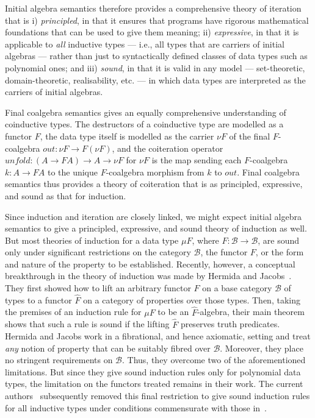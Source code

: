 \documentclass{LMCS}
\newcommand{\ra}{\rightarrow}
\newcommand\B{{\mathcal B}}
\theoremstyle{plain}
\theoremstyle{remark}
\theoremstyle{definition}
\begin{document}
Initial algebra semantics therefore provides a comprehensive theory of
iteration that is i) {\em principled}, in that it ensures that
programs have rigorous mathematical foundations that can be used to
give them meaning; ii) {\em expressive}, in that it is applicable to
{\em all} inductive types --- i.e., all types that are carriers of
initial algebras --- rather than just to syntactically defined classes
of data types such as polynomial ones; and iii) {\em sound}, in that
it is valid in any model --- set-theoretic, domain-theoretic,
realisability, etc. --- in which data types are interpreted as the
carriers of initial algebras.

Final coalgebra semantics gives an equally comprehensive understanding
of coinductive types. The destructors of a coinductive type are
modelled as a functor $F$, the data type itself is modelled as the
carrier $\nu F$ of the final $F$-coalgebra $\mathit{out} : \nu F \ra
F(\nu F)$, and the coiteration operator $\mathit{unfold} : (A \ra F A)
\ra A \ra \nu F$ for $\nu F$ is the map sending each $F$-coalgebra
$k:A \ra FA$ to the unique $F$-coalgebra morphism from $k$ to
$\mathit{out}$.  Final coalgebra semantics thus provides a theory of
coiteration that is as principled, expressive, and sound as that for
induction.

Since induction and iteration are closely linked, we might expect
initial algebra semantics to give a principled, expressive, and sound
theory of induction as well. But most theories of induction for a data
type $\mu F$, where $F:\B \ra \B$, are sound only under significant
restrictions on the category $\B$, the functor $F$, or the form and
nature of the property to be established. Recently, however, a
conceptual breakthrough in the theory of induction was made by Hermida
and Jacobs~\cite{hj98}. They first showed how to lift an arbitrary
functor $F$ on a base category $\B$ of types to a functor $\hat{F}$ on
a category of properties over those types. Then, taking the premises
of an induction rule for $\mu F$ to be an $\hat{F}$-algebra, their
main theorem shows that such a rule is sound if the lifting $\hat{F}$
preserves truth predicates. Hermida and Jacobs work in a fibrational,
and hence axiomatic, setting and treat {\em any} notion of property
that can be suitably fibred over $\B$. Moreover, they place no
stringent requirements on $\B$. Thus, they overcome two of the
aforementioned limitations. But since they give sound induction rules
only for polynomial data types, the limitation on the functors treated
remains in their work. The current authors~\cite{gjf10} subsequently
removed this final restriction to give sound induction rules for all
inductive types under conditions commensurate with those
in~\cite{hj98}.
\end{document}
